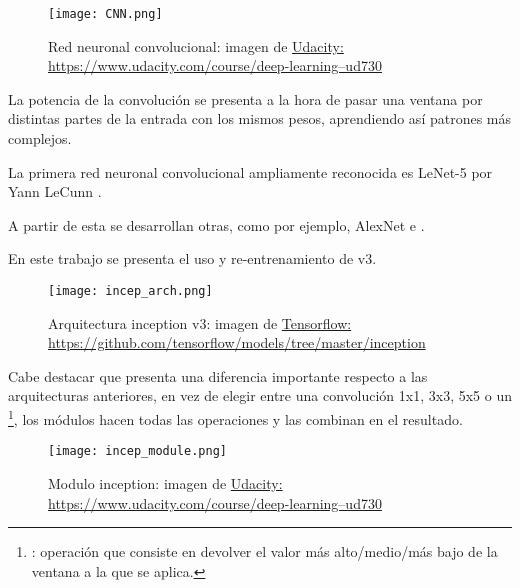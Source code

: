 \begin{figure}
	\centering
	\texttt{[image: CNN.png]}
	\caption[Red neuronal convolucional]{Red neuronal convolucional: imagen de \href{https://www.udacity.com/course/deep-learning--ud730}{Udacity: https://www.udacity.com/course/deep-learning--ud730}}\label{fig:CNN.png}
\end{figure}

La potencia de la convolución se presenta a la hora de pasar una ventana por distintas partes de la entrada con los mismos pesos, aprendiendo así patrones más complejos.

La primera red neuronal convolucional ampliamente reconocida es LeNet-5 por Yann LeCunn \cite{lecun98}. 

A partir de esta se desarrollan otras, como por ejemplo, AlexNet\cite{alexnet} e \cite{incep}.

En este trabajo se presenta el uso y re-entrenamiento de  v3.

\begin{figure}
	\centering
	\texttt{[image: incep\_arch.png]}
	\caption[Arquitectura inception v3]{Arquitectura inception v3: imagen de \href{https://github.com/tensorflow/models/tree/master/inception}{Tensorflow: https://github.com/tensorflow/models/tree/master/inception}}\label{fig:incep_arch.png}
\end{figure}

Cabe destacar que  presenta una diferencia importante respecto a las arquitecturas anteriores, en vez de elegir entre una convolución 1x1, 3x3, 5x5 o un \footnote{: operación que consiste en devolver el valor más alto/medio/más bajo de la ventana a la que se aplica.}, los módulos  hacen todas las operaciones y las combinan en el resultado.

\begin{figure}
	\centering
	\texttt{[image: incep\_module.png]}
	\caption[Módulo inception]{Modulo inception: imagen de \href{https://www.udacity.com/course/deep-learning--ud730}{Udacity: https://www.udacity.com/course/deep-learning--ud730}}\label{fig:incep_module.png}
\end{figure}









